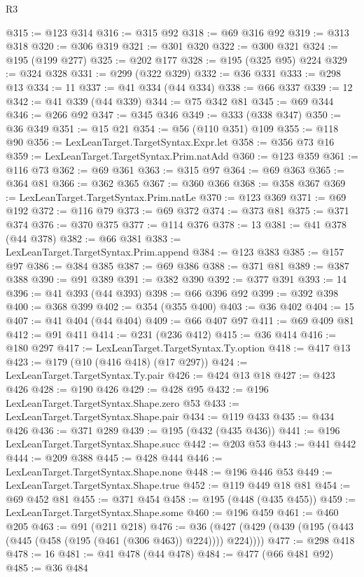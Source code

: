\begin{lexlean}{R3}
\begin{coremodule}
@315 := @123 @314
@316 := @315 @92
@318 := @69 @316 @92
@319 := @313 @318
@320 := @306 @319
@321 := @301 @320
@322 := @300 @321
@324 := @195 (@199 @277)
@325 := @202 @177
@328 := @195 (@325 @95) @224
@329 := @324 @328
@331 := @299 (@322 @329)
@332 := @36 @331
@333 := @298 @13
@334 := 11
@337 := @41 @334 (@44 @334)
@338 := @66 @337
@339 := 12
@342 := @41 @339 (@44 @339)
@344 := @75 @342 @81
@345 := @69 @344
@346 := @266 @92
@347 := @345 @346
@349 := @333 (@338 @347)
@350 := @36 @349
@351 := @15 @21
@354 := @56 (@110 @351) @109
@355 := @118 @90
@356 := LexLeanTarget.TargetSyntax.Expr.let
@358 := @356 @73 @16
@359 := LexLeanTarget.TargetSyntax.Prim.natAdd
@360 := @123 @359
@361 := @116 @73
@362 := @69 @361
@363 := @315 @97
@364 := @69 @363
@365 := @364 @81
@366 := @362 @365
@367 := @360 @366
@368 := @358 @367
@369 := LexLeanTarget.TargetSyntax.Prim.natLe
@370 := @123 @369
@371 := @69 @192
@372 := @116 @79
@373 := @69 @372
@374 := @373 @81
@375 := @371 @374
@376 := @370 @375
@377 := @114 @376
@378 := 13
@381 := @41 @378 (@44 @378)
@382 := @66 @381
@383 := LexLeanTarget.TargetSyntax.Prim.append
@384 := @123 @383
@385 := @157 @97
@386 := @384 @385
@387 := @69 @386
@388 := @371 @81
@389 := @387 @388
@390 := @91 @389
@391 := @382 @390
@392 := @377 @391
@393 := 14
@396 := @41 @393 (@44 @393)
@398 := @66 @396 @92
@399 := @392 @398
@400 := @368 @399
@402 := @354 (@355 @400)
@403 := @36 @402
@404 := 15
@407 := @41 @404 (@44 @404)
@409 := @66 @407 @97
@411 := @69 @409 @81
@412 := @91 @411
@414 := @231 (@236 @412)
@415 := @36 @414
@416 := @180 @297
@417 := LexLeanTarget.TargetSyntax.Ty.option
@418 := @417 @13
@423 := @179 (@10 (@416 @418) (@17 @297))
@424 := LexLeanTarget.TargetSyntax.Ty.pair
@426 := @424 @13 @18
@427 := @423 @426
@428 := @190 @426
@429 := @428 @95
@432 := @196 LexLeanTarget.TargetSyntax.Shape.zero @53
@433 := LexLeanTarget.TargetSyntax.Shape.pair
@434 := @119 @433
@435 := @434 @426
@436 := @371 @289
@439 := @195 (@432 (@435 @436))
@441 := @196 LexLeanTarget.TargetSyntax.Shape.succ
@442 := @203 @53
@443 := @441 @442
@444 := @209 @388
@445 := @428 @444
@446 := LexLeanTarget.TargetSyntax.Shape.none
@448 := @196 @446 @53
@449 := LexLeanTarget.TargetSyntax.Shape.true
@452 := @119 @449 @18 @81
@454 := @69 @452 @81
@455 := @371 @454
@458 := @195 (@448 (@435 @455))
@459 := LexLeanTarget.TargetSyntax.Shape.some
@460 := @196 @459
@461 := @460 @205
@463 := @91 (@211 @218)
@476 := @36 (@427 (@429 (@439 (@195 (@443 (@445 (@458 (@195 (@461 (@306 @463)) @224)))) @224))))
@477 := @298 @418
@478 := 16
@481 := @41 @478 (@44 @478)
@484 := @477 (@66 @481 @92)
@485 := @36 @484

\end{coremodule}
\end{lexlean}
